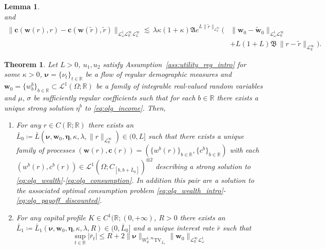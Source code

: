 \documentclass[10pt,a4paper]{amsart}
\theoremstyle{plain}
\newtheorem{thm}{Theorem}
\newtheorem{lem}{Lemma}
\theoremstyle{plain}
\theoremstyle{definition}
\theoremstyle{remark}
\newcommand{\TV}{\text{TV}}
\newcommand{\bc}{\mathbf{c}}
\newcommand{\bmeta}{\boldsymbol{\eta}}
\newcommand{\bnu}{\boldsymbol{\nu}}
\newcommand{\bw}{\mathbf{w}}
\newcommand{\mbR}{\mathbb{R}}
\newcommand{\mfA}{\mathfrak{A}}
\newcommand{\mfB}{\mathfrak{B}}
\newcommand{\msL}{\mathscr{L}}
\begin{document}
\begin{lem}
\begin{equation}
	 \end{equation}
	 and
	 \begin{equation}\label{eq:olg_consump_rate_stability}	 
\begin{aligned}
	 	\|\bc(\bw(r),r)-\bc(\bw(\tilde{r}),\tilde{r})\|_{\msL^1_\omega \msL^\infty_{\mbR} \msL^\infty_{L}} \lesssim \,\lambda \kappa (1+\kappa) \mfA e^{L\|\tilde{r}\|_{\msL^\infty_\mbR}}  \bigg( &\|\bw_0-\tilde{\bw}_0\|_{\msL^1_\omega\msL^\infty_\mbR }\\
	 	&+ L (1+L)\mfB  \,\|r-\tilde{r}\|_{\msL^\infty_\mbR}\bigg).
	 	\end{aligned}
	 \end{equation}
\end{lem}

\begin{thm}\label{thm:olg_well_posed}
 Let $L>0$, $u_1, u_2$ satisfy Assumption~\ref{ass:utility_reg_intro} for some $\kappa >0$, $\bnu = \{\nu_t\}_{t\in \mbR}$ be a flow of \emph{regular demographic measures} and $\bw_0  = \{w^b_b\}_{b\in \mbR}\subset\msL^1(\Omega;\mbR)$ be a family of integrable real-valued random variables and $\mu,\,\sigma$ be sufficiently regular coefficients such that for each $b\in \mbR$ there exists a unique strong solution $\eta^b$ to \eqref{eq:olg_income}. Then, 
 \begin{enumerate}[label=\roman*)]
     \item  For any $r\in C(\mbR;\mbR)$  there exists an $\bar{L}_0\coloneqq \bar{L}(\bnu,\bw_0, \bmeta, \kappa,\lambda,\|r\|_{\msL^\infty_\mbR}) \in (0,L]$ such that  there exists a unique family of processes $(\bw(r),\bc(r)) = (\{w^b(r)\}_{b\in \mbR},\{c^b\}_{b\in \mbR})$ with each $(w^b(r),c^b(r))\in \msL^1(\Omega;C_{[b,b+\bar{L}_0]})^{\otimes 2}$ describing a strong solution to \eqref{eq:olg_wealth}-\eqref{eq:olg_consumption}. In addition this pair are a solution to the associated optimal consumption problem \eqref{eq:olg_wealth_intro}-\eqref{eq:olg_payoff_discounted}. \label{it:olg_well_posed_specific}
     \item For any capital profile $K\in C^1(\mbR;(0,+\infty)$, $R>0$ there exists an $\bar{L}_1 \coloneqq \bar{L}_1 (\bnu,\bw_0, \bmeta, \kappa,\lambda,R)\in (0,\bar{L}_0]$ and a unique interest rate $\bar{r}$ such that
     \begin{equation}\label{eq:olg_gen_eq_ball}
         \sup_{t\in \mbR} |\bar{r}_t| \leq R + 2\|\bnu\|_{W^{1,\infty}_{\mbR}\TV_{\bar{L}_1}} \|\bw_0\|_{\msL^\infty_\mbR \msL^1_\omega}
     \end{equation}

\end{enumerate}
\end{thm}
\end{document}
